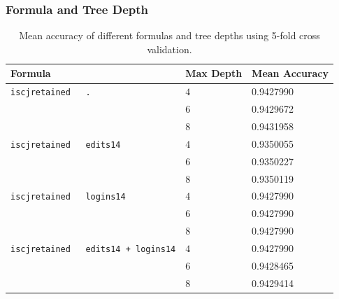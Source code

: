 \subsubsection{Formula and Tree Depth}

\begin{table}[]
	\centering
	\begin{tabular}{l|l|l}
		\textbf{Formula}                           & \textbf{Max Depth} & \textbf{Mean Accuracy} \\ \hline
		\texttt{iscjretained ~ .}                  & $4$                & 0.9427990              \\
		                                           & $6$                & 0.9429672              \\ %
		                                           & $8$                & 0.9431958              \\ %
		\texttt{iscjretained ~ edits14}            & $4$                & 0.9350055              \\
		                                           & $6$                & 0.9350227              \\
		                                           & $8$                & 0.9350119              \\
		\texttt{iscjretained ~ logins14}           & $4$                & 0.9427990              \\
		                                           & $6$                & 0.9427990              \\
		                                           & $8$                & 0.9427990              \\
		\texttt{iscjretained ~ edits14 + logins14} & $4$                & 0.9427990              \\
		                                           & $6$                & 0.9428465              \\
		                                           & $8$                & 0.9429414             
	\end{tabular}
	\caption{Mean accuracy of different formulas and tree depths using 5-fold cross
		validation.}
	\label{tab:formulacompare}
\end{table}